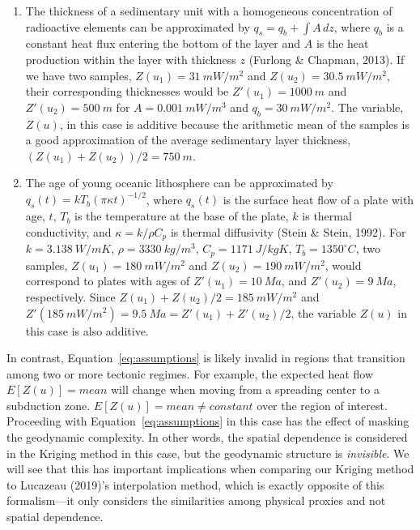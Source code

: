 \documentclass[draft,linenumbers]{agujournal2018}
\begin{document}
\begin{enumerate}
\def\labelenumi{\arabic{enumi}.}
\item
  The thickness of a sedimentary unit with a homogeneous concentration
  of radioactive elements can be approximated by
  \(q_s = q_b + \int A \,dz\), where \(q_b\) is a constant heat flux
  entering the bottom of the layer and \(A\) is the heat production
  within the layer with thickness \(z\) (Furlong \& Chapman, 2013). If
  we have two samples, \(Z(u_1) = 31~mW/m^2\) and
  \(Z(u_2) = 30.5~mW/m^2\), their corresponding thicknesses would be
  \(Z'(u_1) = 1000~m\) and \(Z'(u_2) = 500~m\) for \(A = 0.001~mW/m^3\)
  and \(q_b = 30~mW/m^2\). The variable, \(Z(u)\), in this case is
  additive because the arithmetic mean of the samples is a good
  approximation of the average sedimentary layer thickness,
  \((Z(u_1) + Z(u_2)) / 2 = 750~m\).
\item
  The age of young oceanic lithosphere can be approximated by
  \(q_s(t) = kT_b(\pi\kappa t)^{-1/2}\), where \(q_s(t)\) is the surface
  heat flow of a plate with age, \(t\), \(T_b\) is the temperature at
  the base of the plate, \(k\) is thermal conductivity, and
  \(\kappa = k/\rho C_p\) is thermal diffusivity (Stein \& Stein, 1992).
  For \(k = 3.138~W/mK\), \(\rho = 3330~kg/m^3\), \(C_p = 1171~J/kgK\),
  \(T_b = 1350^{\circ}C\), two samples, \(Z(u_1) = 180~mW/m^2\) and
  \(Z(u_2) = 190~mW/m^2\), would correspond to plates with ages of
  \(Z'(u_1) = 10~Ma\), and \(Z'(u_2) = 9~Ma\), respectively. Since
  \(Z(u_1) + Z(u_2) / 2 = 185~mW/m^2\) and
  \(Z'(185~mW/m^2) = 9.5~Ma = Z'(u_1) + Z'(u_2) / 2\), the variable
  \(Z(u)\) in this case is also additive.
\end{enumerate}

In contrast, Equation~\ref{eq:assumptions} is likely invalid in regions
that transition among two or more tectonic regimes. For example, the
expected heat flow \(E[Z(u)] = mean\) will change when moving from a
spreading center to a subduction zone. \(E[Z(u)] = mean \neq constant\)
over the region of interest. Proceeding with
Equation~\ref{eq:assumptions} in this case has the effect of masking the
geodynamic complexity. In other words, the spatial dependence is
considered in the Kriging method in this case, but the geodynamic
structure is \emph{invisible}. We will see that this has important
implications when comparing our Kriging method to Lucazeau (2019)'s
interpolation method, which is exactly opposite of this formalism---it
only considers the similarities among physical proxies and not spatial
dependence.
\end{document}
